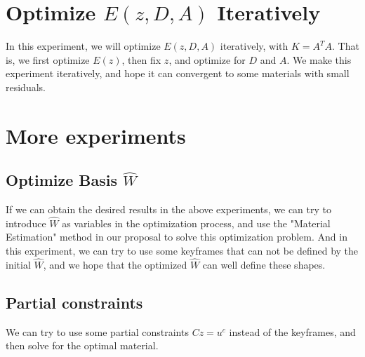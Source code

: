 \documentclass[9pt,twocolumn]{extarticle}
\begin{document}
\section{Optimize $E(z,D,A)$  Iteratively}
In this experiment, we will optimize $E(z,D,A)$ iteratively, with
$K=A^TA$. That is, we first optimize $E(z)$, then fix $z$, and optimize for $D$
and $A$. We make this experiment iteratively, and hope it can convergent to some
materials with small residuals.

\section{More experiments}
\subsection{Optimize Basis $\hat{W}$}
If we can obtain the desired results in the above experiments, we can try to
introduce $\hat{W}$ as variables in the optimization process, and use the
"Material Estimation" method in our proposal to solve this optimization
problem. And in this experiment, we can try to use some keyframes that can not
be defined by the initial $\hat{W}$, and we hope that the optimized $\hat{W}$
can well define these shapes.

\subsection{Partial constraints}
We can try to use some partial constraints $Cz = u^c$ instead of the keyframes,
and then solve for the optimal material.


\end{document}
